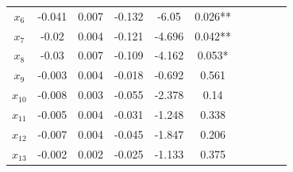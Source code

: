 \documentclass[UTF8]{ctexart}
\begin{document}
\begin{table}[H]
\begin{tabular}{|c|c|c|c|c|c|c|c|c|}
                        $x_{6}$                  & -0.041                             & 0.007                           & -0.132             & -6.05              & 0.026**                  & ~                                   & ~                      & ~                                   \\ \cline{1-6}
                        $x_{7}$                  & -0.02                              & 0.004                           & -0.121             & -4.696             & 0.042**                  & ~                                   & ~                      & ~                                   \\ \cline{1-6}
                        $x_{8}$                  & -0.03                              & 0.007                           & -0.109             & -4.162             & 0.053*                   & ~                                   & ~                      & ~                                   \\ \cline{1-6}
                        $x_{9}$                  & -0.003                             & 0.004                           & -0.018             & -0.692             & 0.561                    & ~                                   & ~                      & ~                                   \\ \cline{1-6}
                        $x_{10}$                 & -0.008                             & 0.003                           & -0.055             & -2.378             & 0.14                     & ~                                   & ~                      & ~                                   \\ \cline{1-6}
                        $x_{11}$                 & -0.005                             & 0.004                           & -0.031             & -1.248             & 0.338                    & ~                                   & ~                      & ~                                   \\ \cline{1-6}
                        $x_{12}$                 & -0.007                             & 0.004                           & -0.045             & -1.847             & 0.206                    & ~                                   & ~                      & ~                                   \\ \cline{1-6}
                        $x_{13}$                 & -0.002                             & 0.002                           & -0.025             & -1.133             & 0.375                    & ~                                   & ~                      & ~                                   \\ \cline{1-6}

\end{tabular}
\end{table}
\end{document}
